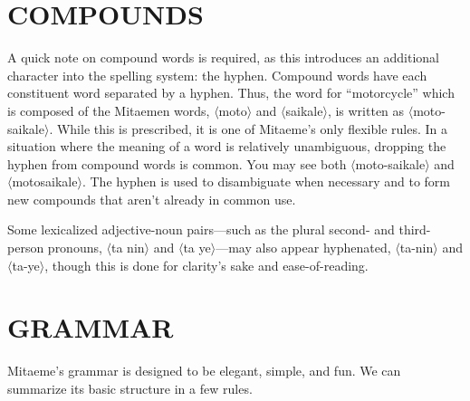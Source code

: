 \documentclass[a4paper, titlepage]{article}
\begin{document}
\section{COMPOUNDS}

A quick note on compound words is required, as this introduces an additional character into the spelling system: the hyphen. Compound words have each constituent word separated by a hyphen. Thus, the word for ``motorcycle'' which is composed of the Mitaemen words, $\langle$moto$\rangle$  and $\langle$saikale$\rangle$, is written as $\langle$moto-saikale$\rangle$. While this is prescribed, it is one of Mitaeme's only flexible rules. In a situation where the meaning of a word is relatively unambiguous, dropping the hyphen from compound words is common. You may see both $\langle$moto-saikale$\rangle$ and $\langle$motosaikale$\rangle$. The hyphen is used to disambiguate when necessary and to form new compounds that aren't already in common use.

Some lexicalized adjective-noun pairs—such as the plural second- and third-person pronouns, $\langle$ta nin$\rangle$ and $\langle$ta ye$\rangle$—may also appear hyphenated,  $\langle$ta-nin$\rangle$ and $\langle$ta-ye$\rangle$, though this is done for clarity's sake and ease-of-reading.

\section{GRAMMAR}

Mitaeme's grammar is designed to be elegant,  simple, and fun. We can summarize its basic structure in a few rules.
\end{document}

